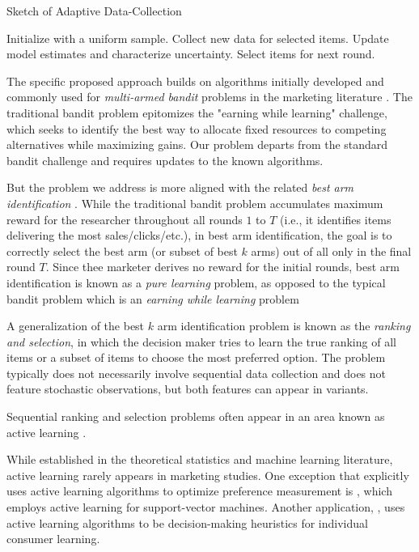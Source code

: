 \documentclass[nonblindrev]{informs3}
\begin{document}
\begin{algorithm}
\caption{Sketch of Adaptive Data-Collection} \label{alg:general}
\begin{algorithmic}[1]
\State Initialize with a uniform sample.
\State Collect new data for selected items.
\State Update model estimates and characterize uncertainty.
\State Select items for next round.
\EndWhile
\end{algorithmic}
\end{algorithm}

The specific proposed approach builds on algorithms initially developed and commonly used for \emph{multi-armed bandit} problems in the marketing literature \citep{HauserEtAl2009,schwartzetal2017,Scott2010,urban2013morphing}. The traditional bandit problem epitomizes the "earning while learning" challenge, which seeks to identify the best way to allocate fixed resources to competing alternatives while maximizing gains. Our problem departs from the standard bandit challenge and requires updates to the known algorithms.

But the problem we address is more aligned with the related \emph{best arm identification} \citep{russo2016simple}. While the traditional bandit problem accumulates maximum reward for the researcher throughout all rounds $1$ to $T$ (i.e., it identifies items delivering the most sales/clicks/etc.), in best arm identification, the goal is to correctly select the best arm (or subset of best $k$ arms) out of all only in the final round $T$. Since thee marketer derives no reward for the initial rounds, best arm identification is known as a \emph{pure learning} problem, as opposed to the typical bandit problem which is an \emph{earning while learning} problem

A generalization of the best $k$ arm identification problem is known as the \emph{ranking and selection}, in which the decision maker tries to learn the true ranking of all items or a subset of items to choose the most preferred option. The problem typically does not necessarily involve sequential data collection and does not feature stochastic observations, but both features can appear in variants.

Sequential ranking and selection problems often appear in an area known as active learning \citep{balcan2009agnostic,dasgupta2008general}. 

While established in the theoretical statistics and machine learning literature, active learning rarely appears in marketing studies. One exception that explicitly uses active learning algorithms to optimize preference measurement is \cite{huang2016consumer}, which employs active learning for support-vector machines. Another application, \cite{dzyabura2011activelearn}, uses active learning algorithms to be decision-making heuristics for individual consumer learning. 
\end{document}
